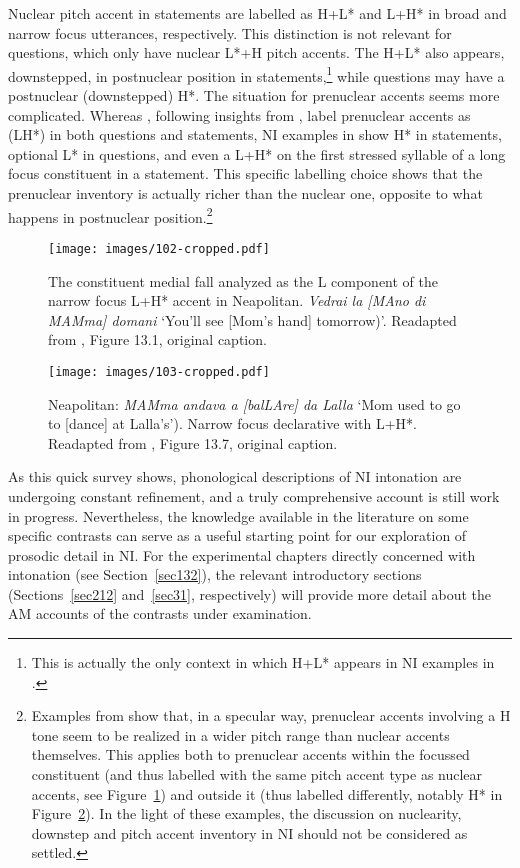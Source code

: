 Nuclear pitch accent in statements are labelled as H+L* and L+H* in broad and narrow focus utterances, respectively. This distinction is not relevant for questions, which only have nuclear L*+H pitch accents. The H+L* also appears, downstepped, in postnuclear position in statements,\footnote{This is actually the only context in which H+L* appears in NI examples in \citet{grice2005strategy}.} while questions may have a postnuclear (downstepped) H*. The situation for prenuclear accents seems more complicated. Whereas \citet{petrone2011tones}, following insights from \citet{prieto2005pitch}, label prenuclear accents as (LH*) in both questions and statements, NI examples in \citet{grice2005strategy} show H* in statements, optional L* in questions, and even a L+H* on the first stressed syllable of a long focus constituent in a statement. This specific labelling choice shows that the prenuclear inventory is actually richer than the nuclear one, opposite to what happens in postnuclear position.\footnote{Examples from \citet{grice2005strategy} show that, in a specular way, prenuclear accents involving a H tone seem to be realized in a wider pitch range than nuclear accents themselves. This applies both to prenuclear accents within the focussed constituent (and thus labelled with the same pitch accent type as nuclear accents, see Figure~\ref{fig102}) and outside it (thus labelled differently, notably H* in Figure~\ref{fig103}). In the light of these examples, the discussion on nuclearity, downstep and pitch accent inventory in NI should not be considered as settled.}

\begin{figure}[p]
\centering
\texttt{[image: images/102-cropped.pdf]}
\caption{The constituent medial fall analyzed as the L component of the narrow focus L+H* accent in Neapolitan. \textit{Vedrai la [MAno di MAMma] domani} `You'll see [Mom's hand] tomorrow)'. Readapted from \citealt{grice2005strategy}, Figure 13.1, original caption.}
\label{fig102}\end{figure}

\begin{figure}[p]
\centering
\texttt{[image: images/103-cropped.pdf]}
\caption{Neapolitan: \textit{MAMma andava a [balLAre] da Lalla} `Mom used to go to [dance] at Lalla's'). Narrow focus declarative with L+H*. Readapted from \citealt{grice2005strategy}, Figure 13.7, original caption.}
\label{fig103}\end{figure}

As this quick survey shows, phonological descriptions of NI intonation are undergoing constant refinement, and a truly comprehensive account is still work in progress. Nevertheless, the knowledge available in the literature on some specific contrasts can serve as a useful starting point for our exploration of prosodic detail in NI. For the experimental chapters directly concerned with intonation (see Section~\ref{sec132}), the relevant introductory sections (Sections~\ref{sec212} and~\ref{sec31}, respectively) will provide more detail about the AM accounts of the contrasts under examination.

